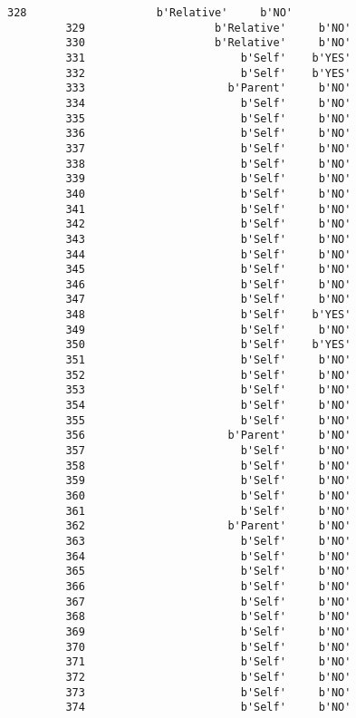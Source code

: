 \documentclass[11pt]{article}
\begin{document}
\begin{Verbatim}[commandchars=\\\{\}]
         328                    b'Relative'     b'NO'  
         329                    b'Relative'     b'NO'  
         330                    b'Relative'     b'NO'  
         331                        b'Self'    b'YES'  
         332                        b'Self'    b'YES'  
         333                      b'Parent'     b'NO'  
         334                        b'Self'     b'NO'  
         335                        b'Self'     b'NO'  
         336                        b'Self'     b'NO'  
         337                        b'Self'     b'NO'  
         338                        b'Self'     b'NO'  
         339                        b'Self'     b'NO'  
         340                        b'Self'     b'NO'  
         341                        b'Self'     b'NO'  
         342                        b'Self'     b'NO'  
         343                        b'Self'     b'NO'  
         344                        b'Self'     b'NO'  
         345                        b'Self'     b'NO'  
         346                        b'Self'     b'NO'  
         347                        b'Self'     b'NO'  
         348                        b'Self'    b'YES'  
         349                        b'Self'     b'NO'  
         350                        b'Self'    b'YES'  
         351                        b'Self'     b'NO'  
         352                        b'Self'     b'NO'  
         353                        b'Self'     b'NO'  
         354                        b'Self'     b'NO'  
         355                        b'Self'     b'NO'  
         356                      b'Parent'     b'NO'  
         357                        b'Self'     b'NO'  
         358                        b'Self'     b'NO'  
         359                        b'Self'     b'NO'  
         360                        b'Self'     b'NO'  
         361                        b'Self'     b'NO'  
         362                      b'Parent'     b'NO'  
         363                        b'Self'     b'NO'  
         364                        b'Self'     b'NO'  
         365                        b'Self'     b'NO'  
         366                        b'Self'     b'NO'  
         367                        b'Self'     b'NO'  
         368                        b'Self'     b'NO'  
         369                        b'Self'     b'NO'  
         370                        b'Self'     b'NO'  
         371                        b'Self'     b'NO'  
         372                        b'Self'     b'NO'  
         373                        b'Self'     b'NO'  
         374                        b'Self'     b'NO'  

\end{Verbatim}
\end{document}
